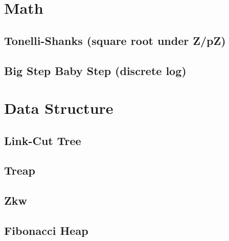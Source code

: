\section{Math}
\subsection{Tonelli-Shanks (square root under Z/pZ)}

\subsection{Big Step Baby Step (discrete log)}


\section{Data Structure}
\subsection{Link-Cut Tree}

\subsection{Treap}

\subsection{Zkw}

\subsection{Fibonacci Heap}






